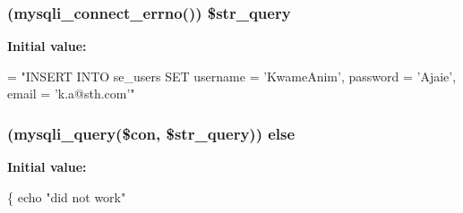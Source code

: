 \subsubsection[{\$str\+\_\+query}]{ (mysqli\+\_\+connect\+\_\+errno()) \$str\+\_\+query}\label{test_my_s_q_li_8php_afde3e504e8907bba3a5dcde60c537684}
{\bfseries Initial value\+:}
\begin{DoxyCode}
= \textcolor{stringliteral}{"INSERT INTO se\_users SET}
\textcolor{stringliteral}{              username = 'KwameAnim',}
\textcolor{stringliteral}{              password = 'Ajaie',}
\textcolor{stringliteral}{              email = 'k.a@sth.com'"}
\end{DoxyCode}
\hypertarget{test_my_s_q_li_8php_ac9f66270db9e132395b030ed84d6ddb5}{}
\subsubsection[{else}]{ (mysqli\+\_\+query(\$con, \$str\+\_\+query)) else}\label{test_my_s_q_li_8php_ac9f66270db9e132395b030ed84d6ddb5}
{\bfseries Initial value\+:}
\begin{DoxyCode}
\{
    echo \textcolor{stringliteral}{"did not work"}
\end{DoxyCode}
